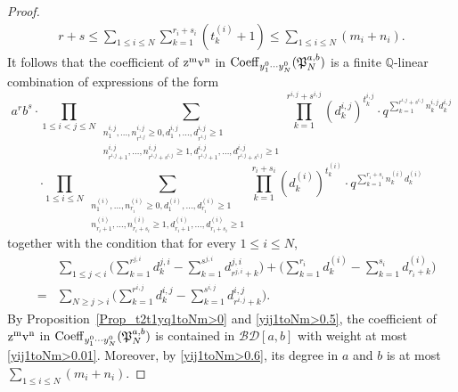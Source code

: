 \documentclass[12pt, reqno]{amsart}
\theoremstyle{definition}
\theoremstyle{remark}
\numberwithin{equation}{section}
\newcommand{\BD}{\mathcal {BD}}
\newcommand{\Coe}{ {\rm Coeff} }
\newcommand{\Q}{ \mathbb Q }
\numberwithin{equation}{section}
\begin{document}
\begin{proof}
\begin{eqnarray}
r+s \le \sum_{1 \le i \le N} \sum_{k=1}^{r_i+s_i} (t_k^{(i)} +1) 
\le \sum_{1 \le i \le N} (m_i + n_i).
\end{eqnarray}
It follows that the coefficient of ${\rm z^mv^n}$ in 
$\Coe_{y_1^0 \cdots y_N^0}(\mathfrak P_N^{a,b})$ 
is a finite $\Q$-linear combination of expressions of the form
$$ 
a^rb^s \cdot \prod_{1 \le i < j \le N}
\sum_{\substack{n_1^{i,j}, \ldots, n_{r^{i,j}}^{i,j} \ge 0, 
    d_1^{i,j}, \ldots, d_{r^{i,j}}^{i,j} \ge 1\\
    n_{r^{i,j}+1}^{i,j}, \ldots, n_{r^{i,j}+s^{i,j}}^{i,j} \ge 1,
    d_{r^{i,j}+1}^{i,j}, \ldots, d_{r^{i,j}+s^{i,j}}^{i,j} \ge 1}}
  \prod_{k=1}^{r^{i,j}+s^{i,j}} (d_k^{i,j})^{t_k^{i,j}} 
\cdot q^{\sum_{k=1}^{r^{i,j}+s^{i,j}} n_k^{i,j} d_k^{i,j}}
$$
$$
\cdot \prod_{1 \le i \le N}
\sum_{\substack{n_1^{(i)}, \ldots, n_{r_i}^{(i)} \ge 0, 
    d_1^{(i)}, \ldots, d_{r_i}^{(i)} \ge 1\\
    n_{r_i+1}^{(i)}, \ldots, n_{r_i+s_i}^{(i)} \ge 1,
    d_{r_i+1}^{(i)}, \ldots, d_{r_i+s_i}^{(i)} \ge 1}}
  \prod_{k=1}^{r_i+s_i} (d_k^{(i)})^{t_k^{(i)}}
\cdot q^{\sum_{k=1}^{r_i+s_i} n_k^{(i)} d_k^{(i)}}
$$
together with the condition that for every $1 \le i \le N$,
\begin{eqnarray*}
& &\sum_{1 \le j < i} \bigg (\sum_{k=1}^{r^{j,i}} d_k^{j,i} 
    - \sum_{k=1}^{s^{j,i}} d_{r^{j,i}+k}^{j,i} \bigg )
  + \bigg (\sum_{k=1}^{r_i} d_k^{(i)} 
    - \sum_{k=1}^{s_i} d_{r_i+k}^{(i)} \bigg )    \\
&=&\sum_{N \ge j > i} \bigg (\sum_{k=1}^{r^{i,j}} d_k^{i,j} 
    - \sum_{k=1}^{s^{i,j}} d_{r^{i,j}+k}^{i,j} \bigg ).
\end{eqnarray*}
By Proposition~\ref{Prop_t2t1yq1toNm>0} and \eqref{yij1toNm>0.5}, 
the coefficient of ${\rm z^mv^n}$ in 
$\Coe_{y_1^0 \cdots y_N^0}(\mathfrak P_N^{a,b})$ is contained in 
$\BD[a, b]$ with weight at most \eqref{yij1toNm>0.01}. 
Moreover, by \eqref{yij1toNm>0.6},
its degree in $a$ and $b$ is at most $\sum_{1 \le i \le N} (m_i + n_i)$.


\end{proof}
\end{document}
